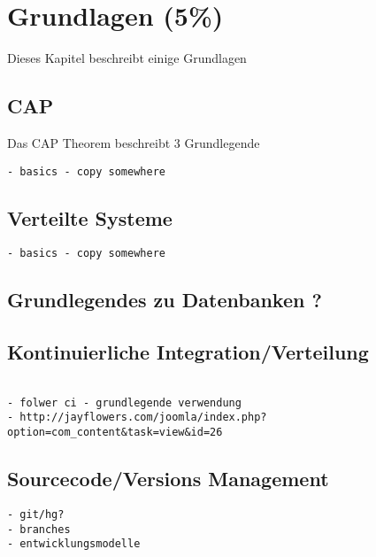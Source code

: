\chapter{Grundlagen (5\%)}

Dieses Kapitel beschreibt einige Grundlagen

\section{CAP}
\label{sec:base:cap}



Das CAP Theorem beschreibt 3 Grundlegende

\begin{verbatim}
- basics - copy somewhere
\end{verbatim}

\section{Verteilte Systeme}

\begin{verbatim}
- basics - copy somewhere
\end{verbatim}

\section{Grundlegendes zu Datenbanken ?}


\section{Kontinuierliche Integration/Verteilung}
\begin{verbatim}

- folwer ci - grundlegende verwendung
- http://jayflowers.com/joomla/index.php?option=com_content&task=view&id=26
\end{verbatim}

\section{Sourcecode/Versions Management}

\begin{verbatim}
- git/hg?
- branches
- entwicklungsmodelle
\end{verbatim}
